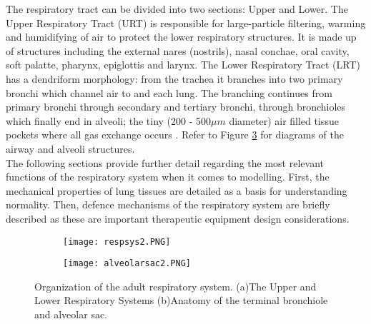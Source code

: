 \documentclass[12pt, openany, oneside]{book}
\begin{document}
The respiratory tract can be divided into two sections: Upper and Lower. The Upper Respiratory Tract (URT) is responsible for large-particle filtering, warming and humidifying of air to protect the lower respiratory structures. It is made up of structures including the external nares (nostrils), nasal conchae, oral cavity, soft palatte, pharynx, epiglottis and larynx. The Lower Respiratory Tract (LRT) has a dendriform morphology: from the trachea it branches into two primary bronchi which channel air to and each lung. The branching continues from primary bronchi through secondary and tertiary bronchi, through bronchioles which finally end in alveoli; the tiny (200 - 500${\mu}m$  diameter) \cite{ochs2004number} air filled tissue pockets where all gas exchange occurs \cite{martini}. Refer to Figure \ref{fig:anatomy} for diagrams of the airway and alveoli structures. \\

The following sections provide further detail regarding the most relevant functions of the respiratory system when it comes to modelling. First, the mechanical properties of lung tissues are detailed as a basis for understanding normality. Then, defence mechanisms of the respiratory system are briefly described as these are important therapeutic equipment design considerations. 


\begin{figure}
	\begin{center}
	
	\begin{subfigure}{.7\textwidth}
		\centering
		\texttt{[image: respsys2.PNG]}
	
\label{fig:resp}
	\end{subfigure}
	
	\begin{subfigure}{.75\textwidth}
		\centering
		\texttt{[image: alveolarsac2.PNG]}
	
\label{fig:alveolarsac}
	\end{subfigure}	
	
	
	\caption[Organization of the adult respiratory system]{Organization of the adult respiratory system. (a)The Upper and Lower Respiratory Systems (b)Anatomy of the terminal bronchiole and alveolar sac. \citep{martini}} 
\label{fig:anatomy}
\end{center}
\end{figure}
\end{document}
